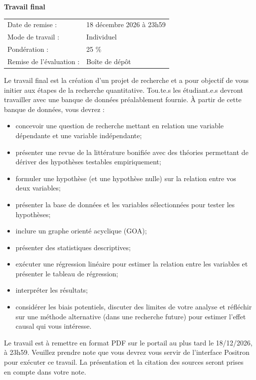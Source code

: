 \documentclass[10pt]{article}
\newcommand{\ulsubsub}[1]{%
  \needspace{3\baselineskip}%
  \vspace{8pt}%
  {\headfont\fontsize{11}{13}\selectfont\bfseries #1}\par
  \vspace{1pt}%
}
\begin{document}
\newpage

\ulsubsub{Travail final}
{\fontsize{9.5}{12.5}\selectfont
\begin{tabular}{@{}L{1.9in}L{5.4in}@{}}
Date de remise : & 18 décembre 2026 à 23h59\\
Mode de travail : & Individuel\\
Pondération : & 25 \%\\
Remise de l'évaluation : & Boîte de dépôt\\
\end{tabular}\par
\vspace{4pt}
Le travail final est la création d'un projet de recherche et a pour objectif de vous initier aux étapes de la recherche quantitative. Tou.te.s les étudiant.e.s devront travailler avec une banque de données préalablement fournie. À partir de cette banque de données, vous devrez :
\begin{itemize}
  \item concevoir une question de recherche mettant en relation une variable dépendante et une variable indépendante;
  \item présenter une revue de la littérature bonifiée avec des théories permettant de dériver des hypothèses testables empiriquement;
  \item formuler une hypothèse (et une hypothèse nulle) sur la relation entre vos deux variables;
  \item présenter la base de données et les variables sélectionnées pour tester les hypothèses;
  \item inclure un graphe orienté acyclique (GOA);
  \item présenter des statistiques descriptives;
  \item exécuter une régression linéaire pour estimer la relation entre les variables et présenter le tableau de régression;
  \item interpréter les résultats;
  \item considérer les biais potentiels, discuter des limites de votre analyse et réfléchir sur une méthode alternative (dans une recherche future) pour estimer l'effet causal qui vous intéresse.
\end{itemize}
Le travail est à remettre en format PDF sur le portail au plus tard le 18/12/2026, à 23h59. Veuillez prendre note que vous devrez vous servir de l'interface Positron pour exécuter ce travail. La présentation et la citation des sources seront prises en compte dans votre note.\par}
\end{document}
